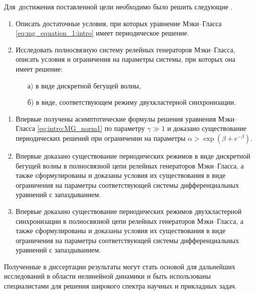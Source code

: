 Для~достижения поставленной цели необходимо было решить следующие {\tasks}.
\begin{enumerate}[beginpenalty=10000] %
	\item Описать достаточные условия, при которых уравнение Мэки--Гласса \eqref{eq:mg_equation_1:intro} имеет периодическое решение.
	\item Исследовать полносвязную систему релейных генераторов Мэки--Гласса, описать условия и ограничения на параметры системы, при которых она имеет решение:
	\begin{enumerate}
		\item[а)]в виде дискретной бегущей волны,
		\item[б)]в виде, соответствующем режиму двухкластерной синхронизации.
	\end{enumerate}
\end{enumerate}

\bigskip

{\novelty}
\begin{enumerate}[beginpenalty=10000] %
  \item Впервые получены асимптотические формулы решения уравнения Мэки--Гласса \eqref{eq:intro:MG_norm1} по параметру $\gamma \gg 1$ и доказано существование периодических решений при ограничении на параметры $\alpha > \exp(\beta + e^{-\beta})$.
  \item Впервые доказано существование периодических режимов в виде дискретной бегущей волны в полносвязной цепи релейных генераторов Мэки--Гласса, а также сформулированы и доказаны условия их существования в виде ограничения на параметры соответствующей системы дифференциальных уравнений с запаздыванием.
  \item Впервые доказано существование периодических режимов двухкластерной синхронизации в полносвязной цепи релейных генераторов Мэки--Гласса, а также сформулированы и доказаны условия их существования в виде ограничения на параметры соответствующей системы дифференциальных уравнений с запаздыванием.
\end{enumerate}

\bigskip

{\influence} Полученные в диссертации результаты могут стать основой для дальнейших исследований в области нелинейной динамики и быть использованы специалистами для решения широкого спектра научных и прикладных задач.

\bigskip

